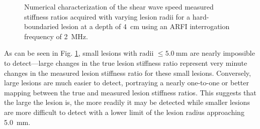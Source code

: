 			\begin{figure}[!htb]
				\centering
				\caption[Numerical characterization of shear wave speed measured stiffness ratio with changing lesion radius]{Numerical characterization of the shear wave speed measured stiffness ratios acquired with varying lesion radii for a hard-boundaried lesion at a depth of \SI{4}{\cm} using an ARFI interrogation frequency of \SI{2}{\MHz}.}
				\label{fig:erel_radius}
			\end{figure}

			As can be seen in Fig. \ref{fig:erel_radius}, small lesions with radii $\leq \SI{5.0}{\mm}$ are nearly impossible to detect---large changes in the true lesion stiffness ratio represent very minute changes in the measured lesion stiffness ratio for these small lesions. Conversely, large lesions are much easier to detect, portraying a nearly one-to-one or better mapping between the true and measured lesion stiffness ratios. This suggests that the large the lesion is, the more readily it may be detected while smaller lesions are more difficult to detect with a lower limit of the lesion radius approaching \SI{5.0}{\mm}.

